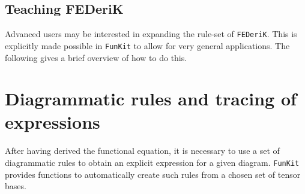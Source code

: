\documentclass[10pt,prd,nofootinbib,superscriptaddress,twocolumn]{revtex4-2}
\newcommand{\FunKit}{\texttt{FunKit}\xspace}
\newcommand{\FEDeriK}{\texttt{FEDeriK}\xspace}
\begin{document}
\subsection{Teaching FEDeriK}
\label{sec:FEDeriK_teaching}

Advanced users may be interested in expanding the rule-set of \FEDeriK. This is explicitly made possible in \FunKit to allow for very general applications. The following gives a brief overview of how to do this.


\section{Diagrammatic rules and tracing of expressions}
\label{sec:DiRK}

After having derived the functional equation, it is necessary to use a set of diagrammatic rules to obtain an explicit expression for a given diagram. \FunKit provides functions to automatically create such rules from a chosen set of tensor bases.
\end{document}

